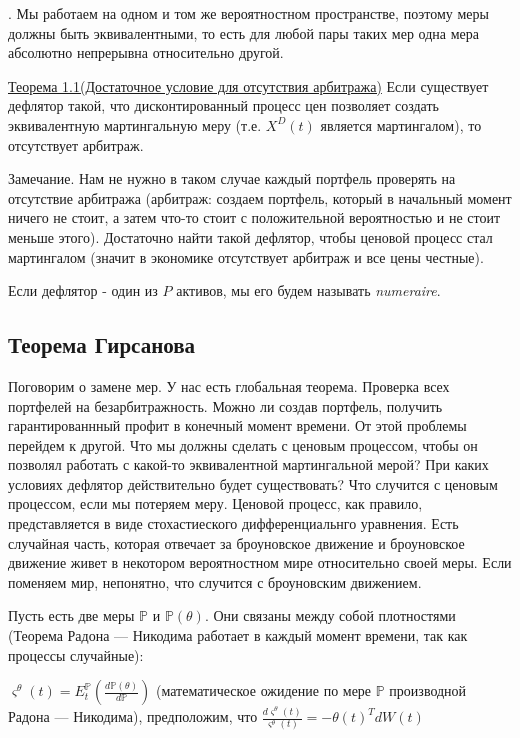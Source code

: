 \documentclass{article}
\begin{document}
. Мы работаем на одном и том же вероятностном пространстве, поэтому меры должны быть эквивалентными, то есть для любой пары таких мер одна мера абсолютно непрерывна относительно другой.
\newline

\underline{Теорема 1.1(Достаточное условие для отсутствия арбитража)} Если существует дефлятор такой, что дисконтированный процесс цен позволяет создать эквивалентную мартингальную меру (т.е. \(X^D\left(t\right)\) является мартингалом), то отсутствует арбитраж.
\newline

Замечание. Нам не нужно в таком случае каждый портфель проверять на отсутствие арбитража (арбитраж: создаем портфель, который в начальный момент ничего не стоит, а затем что-то стоит с положительной вероятностью и не стоит меньше этого). Достаточно найти такой дефлятор, чтобы ценовой процесс стал мартингалом (значит в экономике отсутствует арбитраж и все цены честные).

Если дефлятор - один из \(P\) активов, мы его будем называть \textit{numeraire}.
\subsection{Теорема Гирсанова}
Поговорим о замене мер. У нас есть глобальная теорема. Проверка всех портфелей на  безарбитражность. Можно ли создав портфель, получить гарантированнный профит в конечный момент времени. От этой проблемы перейдем к другой. Что мы должны сделать с ценовым процессом, чтобы он позволял работать с какой-то эквивалентной мартингальной мерой? При каких условиях дефлятор действительно будет существовать? Что случится с ценовым процессом, если мы потеряем меру. Ценовой процесс, как правило, представляется в виде стохастиеского дифференциальнго уравнения. Есть случайная
часть, которая отвечает за броуновское движение и броуновское движение живет в некотором вероятностном мире относительно своей меры. Если поменяем мир, непонятно, что случится с броуновским движением.

Пусть есть две меры \(\mathbb{P}\) и \(\mathbb{P\left(\theta\right)}\). Они связаны между собой плотностями (Теорема Радона — Никодима работает в каждый момент времени, так как процессы случайные):

\(\varsigma^{\theta}\left(t\right)= E_t^\mathbb{P}(\frac{d\mathbb{P(\theta)}}{d\mathbb{P}})\) (математическое ожидение по мере \(\mathbb{P}\) производной Радона — Никодима), предположим, что \(\frac{d\varsigma^{\theta}\left(t\right)}{\varsigma^{\theta}\left(t\right)} = -\theta\left(t\right)^TdW\left(t\right)\)
\end{document}
